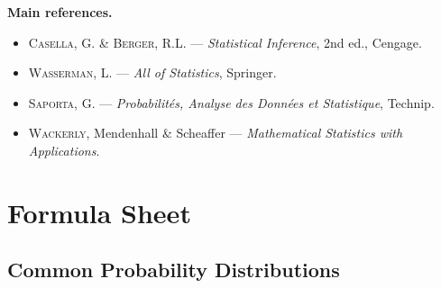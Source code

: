 \documentclass[12pt,a4paper,twoside]{book}
\theoremstyle{definition}
\theoremstyle{plain}
\theoremstyle{remark}
\begin{document}
\medskip
\textbf{Main references.}
\begin{itemize}
\item \textsc{Casella}, G. \& \textsc{Berger}, R.L. --- \emph{Statistical Inference}, 2nd ed., Cengage.
\item \textsc{Wasserman}, L. --- \emph{All of Statistics}, Springer.
\item \textsc{Saporta}, G. --- \emph{Probabilit\'es, Analyse des Donn\'ees et Statistique}, Technip.
\item \textsc{Wackerly}, Mendenhall \& Scheaffer --- \emph{Mathematical Statistics with Applications}.
\end{itemize}

\mainmatter













\backmatter

\appendix
\chapter{Formula Sheet}
\label{app:formulas}

\section{Common Probability Distributions}
\end{document}
